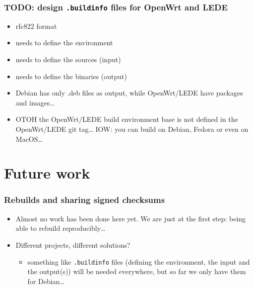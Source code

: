 \documentclass[14pt,aspectratio=169]{beamer}
\begin{document}
\begin{frame}
 \frametitle{TODO: design \texttt{.buildinfo} files for OpenWrt and LEDE}
 \begin{itemize}
  \item rfc822 format
  \item needs to define the environment
  \item needs to define the sources (input)
  \item needs to define the binaries (output)
  \item<2-3> Debian has only .deb files as output, while OpenWrt/LEDE have packages
  and images…
  \item<3> OTOH the OpenWrt/LEDE build environment base is not defined in the
  OpenWrt/LEDE git tag… IOW: you can build on Debian, Fedora or even on MacOS…
 \end{itemize}
\end{frame}


\section{Future work}

\begin{frame}
 \frametitle{Rebuilds and sharing signed checksums}
 \begin{itemize}
  \item Almost no work has been done here yet. We are just at the first step:
  being able to rebuild reproducibly…
  \item Different projects, different solutions?
 \begin{itemize}
  \item<2> something like \texttt{.buildinfo} files (defining the environment,
  the input and the output(s)) will be needed everywhere, but so far we only
  have them for Debian…
 \end{itemize}
 \end{itemize}
\end{frame}
\end{document}
